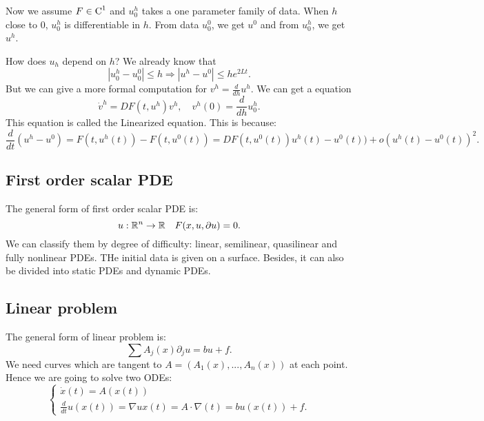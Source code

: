 Now we assume $F\in \operatorname{C}^1$ and $u_0^h$ takes a one parameter family of data. When $h$ close to $0$, $u_0^h$ is differentiable in $h$. From data $u_0^0$, we get $u^0$ and from $u_0^h$, we get $u^h$.

 How does $u_h$ depend on $h$? We already know that 
\[
    |u_0^h -u_0^0| \le h \Rightarrow |u^h - u^0|\le he^{2Lt}.  
\]
But we can give a more formal computation for $v^h = \frac{d}{dh}u^h$. We can get a equation
\[
    \dot{v}^h = D F(t,u^h) v^h, \quad v^h(0) = \frac{d}{dh}u^h_0.
\]
This equation is called the Linearized equation. This is because: 
\[
    \frac{d}{dt}(u^h-u^0) = F(t, u^h(t)) - F(t, u^0(t)) = DF(t, u^0(t))u^h(t) - u^0(t)) + o(u^h(t) - u^0(t))^2.
\]

\subsection{First order scalar PDE}
The general form of first order scalar PDE is: 
\[
    u:\mathbb{R}^n \to \mathbb{R} \quad  F(x,u, \partial u) = 0.    
\]
We can classify them by degree of difficulty: linear, semilinear, quasilinear and fully nonlinear PDEs. THe initial data is given on a surface. Besides, it can also be divided into static PDEs and dynamic PDEs. 

\subsection{ Linear problem}

The general form of linear problem is: 
\[
    \sum A_j(x) \partial_j u = bu + f.    
\]
We need curves which are tangent to $A=(A_1(x),...,A_n(x))$ at each point. Hence we are going to solve two ODEs: 
\[
    \begin{cases}
        \dot{x}(t) = A(x(t))\\ 
        \frac{d}{dt} u(x(t)) = \nabla u x(t) = A \cdot \nabla(t) = b u (x(t) ) + f.
    \end{cases}    
\]